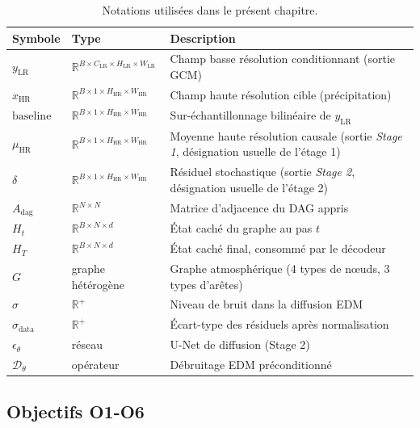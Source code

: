 \documentclass[14pt,a4paper,openany]{extreport}
\theoremstyle{definition}
\newcommand{\LR}{\ensuremath{\text{LR}}}
\newcommand{\HR}{\ensuremath{\text{HR}}}
\newcommand{\xHR}{\ensuremath{x_{\HR}}}
\newcommand{\yLR}{\ensuremath{y_{\LR}}}
\newcommand{\muHR}{\ensuremath{\mu_{\HR}}}
\newcommand{\Adag}{\ensuremath{A_{\mathrm{dag}}}}
\newcommand{\Ht}{\ensuremath{H_t}}
\newcommand{\HT}{\ensuremath{H_T}}
\begin{document}
\begin{table}[ht]
  \centering
  \small
  \caption{Notations utilisées dans le présent chapitre.}
  \label{tab:notations}
  \begin{tabularx}{\linewidth}{l l X}
    \toprule
    \textbf{Symbole} & \textbf{Type} & \textbf{Description} \\
    \midrule
    $\yLR$ & $\mathbb{R}^{B \times C_{\LR} \times H_{\LR} \times W_{\LR}}$ & Champ basse résolution conditionnant (sortie GCM) \\
    $\xHR$ & $\mathbb{R}^{B \times 1 \times H_{\HR} \times W_{\HR}}$ & Champ haute résolution cible (précipitation) \\
    $\mathrm{baseline}$ & $\mathbb{R}^{B \times 1 \times H_{\HR} \times W_{\HR}}$ & Sur-échantillonnage bilinéaire de $\yLR$ \\
    $\muHR$ & $\mathbb{R}^{B \times 1 \times H_{\HR} \times W_{\HR}}$ & Moyenne haute résolution causale (sortie \emph{Stage 1}, désignation usuelle de l'étage 1) \\
    $\delta$ & $\mathbb{R}^{B \times 1 \times H_{\HR} \times W_{\HR}}$ & Résiduel stochastique (sortie \emph{Stage 2}, désignation usuelle de l'étage 2) \\
    $\Adag$ & $\mathbb{R}^{N \times N}$ & Matrice d'adjacence du DAG appris \\
    $\Ht$ & $\mathbb{R}^{B \times N \times d}$ & État caché du graphe au pas $t$ \\
    $\HT$ & $\mathbb{R}^{B \times N \times d}$ & État caché final, consommé par le décodeur \\
    $G$ & graphe hétérogène & Graphe atmosphérique (4 types de nœuds, 3 types d'arêtes) \\
    $\sigma$ & $\mathbb{R}^+$ & Niveau de bruit dans la diffusion EDM \\
    $\sigma_{\mathrm{data}}$ & $\mathbb{R}^+$ & Écart-type des résiduels après normalisation \\
    $\epsilon_\theta$ & réseau & U-Net de diffusion (Stage 2) \\
    $\mathcal{D}_\theta$ & opérateur & Débruitage EDM préconditionné \\
    \bottomrule
  \end{tabularx}
\end{table}

\subsection{Objectifs O1-O6}
\label{ssec:oracle-objectifs}
\end{document}
